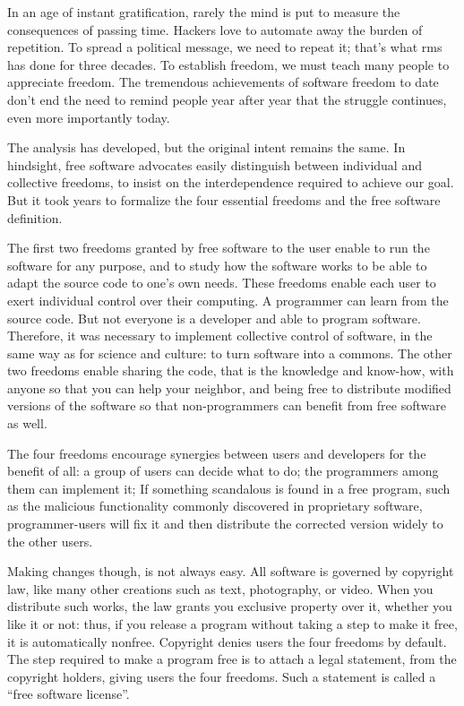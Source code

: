 In an age of instant gratification, rarely the mind is put to measure
the consequences of passing time. Hackers love to automate away the
burden of repetition. To spread a political message, we need to repeat
it; that's what rms has done for three decades. To establish freedom, we
must teach many people to appreciate freedom. The tremendous
achievements of software freedom to date don't end the need to remind
people year after year that the struggle continues, even more
importantly today.

The analysis has developed, but the original intent remains the same. In
hindsight, free software advocates easily distinguish between individual
and collective freedoms, to insist on the interdependence required to
achieve our goal. But it took years to formalize the four essential
freedoms and the free software definition.

The first two freedoms granted by free software to the user enable to
run the software for any purpose, and to study how the software works to
be able to adapt the source code to one's own needs. These freedoms
enable each user to exert individual control over their computing. A
programmer can learn from the source code. But not everyone is a
developer and able to program software. Therefore, it was necessary to
implement collective control of software, in the same way as for science
and culture: to turn software into a commons. The other two freedoms
enable sharing the code, that is the knowledge and know-how, with anyone
so that you can help your neighbor, and being free to distribute
modified versions of the software so that non-programmers can benefit
from free software as well.

The four freedoms encourage synergies between users and developers for
the benefit of all: a group of users can decide what to do; the
programmers among them can implement it; If something scandalous is
found in a free program, such as the malicious functionality commonly
discovered in proprietary software, programmer-users will fix it and
then distribute the corrected version widely to the other users.

Making changes though, is not always easy. All software is governed by
copyright law, like many other creations such as text, photography, or
video. When you distribute such works, the law grants you exclusive
property over it, whether you like it or not: thus, if you release a
program without taking a step to make it free, it is automatically
nonfree. Copyright denies users the four freedoms by default. The step
required to make a program free is to attach a legal statement, from the
copyright holders, giving users the four freedoms. Such a statement is
called a ``free software license''.

